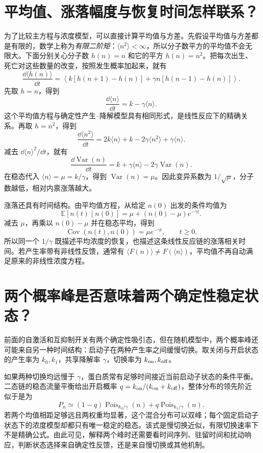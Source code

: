 \section{平均值、涨落幅度与恢复时间怎样联系？}
为了比较主方程与浓度模型，可以直接计算平均值与方差。先假设平均值与方差都是有限的，数学上称为\emph{有限二阶矩}：$\langle n^2\rangle<\infty$，所以分子数平方的平均值不会无限大。下面分别关心分子数 $h(n)=n$ 和它的平方 $h(n)=n^2$。把每次出生、死亡对这些数量的改变，按照发生概率加起来，就有
\[
\frac{\dd\langle h(n)\rangle}{\dd t}
=\left\langle k[h(n+1)-h(n)]+\gamma n[h(n-1)-h(n)]\right\rangle.
\]
先取 $h=n$，得到
\begin{equation}\frac{\dd\langle n\rangle}{\dd t}=k-\gamma\langle n\rangle.\end{equation}
这个平均值方程与确定性产生--降解模型具有相同形式，是线性反应下的精确关系。再取 $h=n^2$，得到
\[
\frac{\dd\langle n^2\rangle}{\dd t}=2k\langle n\rangle+k-2\gamma\langle n^2\rangle+\gamma\langle n\rangle.
\]
减去 $\dd\langle n\rangle^2/\dd t$，就有
\begin{equation}\frac{\dd\operatorname{Var}(n)}{\dd t}=k+\gamma\langle n\rangle-2\gamma\operatorname{Var}(n).\end{equation}
在稳态代入 $\langle n\rangle=\mu=k/\gamma$，得到 $\operatorname{Var}(n)=\mu$。因此变异系数为 $1/\sqrt\mu$，分子数越低，相对内禀涨落越大。

涨落还具有时间结构。由平均值方程，从给定 $n(0)$ 出发的条件均值为
\[
\mathbb E[n(t)\mid n(0)]=\mu+(n(0)-\mu)e^{-\gamma t}.
\]
减去 $\mu$，再乘以 $n(0)-\mu$ 并在稳态平均，得到
\begin{equation}\operatorname{Cov}(n(t),n(0))=\mu e^{-\gamma t},\qquad t\geq0.\end{equation}
所以同一个 $1/\gamma$ 既描述平均浓度的恢复，也描述这条线性反应链的涨落相关时间。若产生率带有非线性反馈，通常有 $\langle F(n)\rangle\ne F(\langle n\rangle)$，平均值不再自动满足原来的非线性浓度方程。

\section{两个概率峰是否意味着两个确定性稳定状态？}
前面的自激活和互抑制开关有两个确定性吸引态，但在随机模型中，两个概率峰还可能来自另一种时间结构：启动子在两种产生率之间缓慢切换。取关闭与开启状态的产生率为 $k_0,k_1$，共享降解率 $\gamma$，切换率为 $k_{\rm on},k_{\rm off}$。

如果两种切换均远慢于 $\gamma$，蛋白质常有足够时间接近当前启动子状态的条件平衡。二态链的稳态流量平衡给出开启概率 $q=k_{\rm on}/(k_{\rm on}+k_{\rm off})$，整体分布的领先阶近似于是为
\[
P_n\simeq(1-q)\operatorname{Pois}_{k_0/\gamma}(n)+q\operatorname{Pois}_{k_1/\gamma}(n).
\]
若两个均值相距足够远且两权重均显著，这个混合分布可以双峰；每个固定启动子状态下的浓度模型却都只有唯一稳定的稳态。该式是慢切换近似，有限切换速率下不是精确公式。由此可见，解释两个峰时还需要看时间序列、驻留时间和扰动响应，判断状态选择来自确定性反馈，还是来自慢切换或其他机制。
